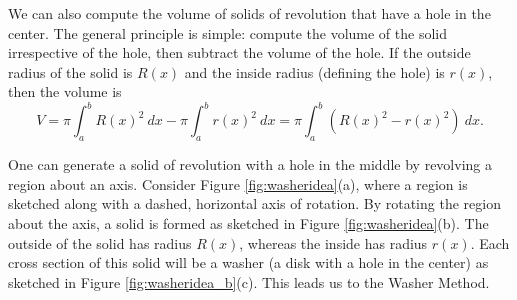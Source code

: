 We can also compute the volume of solids of revolution that have a hole in the center. The general principle is simple: compute the volume of the solid irrespective of the hole, then subtract the volume of the hole. If the outside radius of the solid is $R(x)$ and the inside radius (defining the hole) is $r(x)$, then the volume is 
$$V = \pi\int_a^b R(x)^2 \ dx - \pi\int_a^b r(x)^2\ dx = \pi\int_a^b \left(R(x)^2-r(x)^2\right)\ dx.$$

One can generate a solid of revolution with a hole in the middle by revolving a region about an axis. Consider Figure \ref{fig:washeridea}(a), where a region is sketched along with a dashed, horizontal axis of rotation. By rotating the region about the axis, a solid is formed as sketched in Figure \ref{fig:washeridea}(b). The outside of the solid has radius $R(x)$, whereas the inside has radius $r(x)$. Each cross section of this solid will be a washer (a disk with a hole in the center) as sketched in Figure \ref{fig:washeridea_b}(c).	This leads us to the Washer Method.

